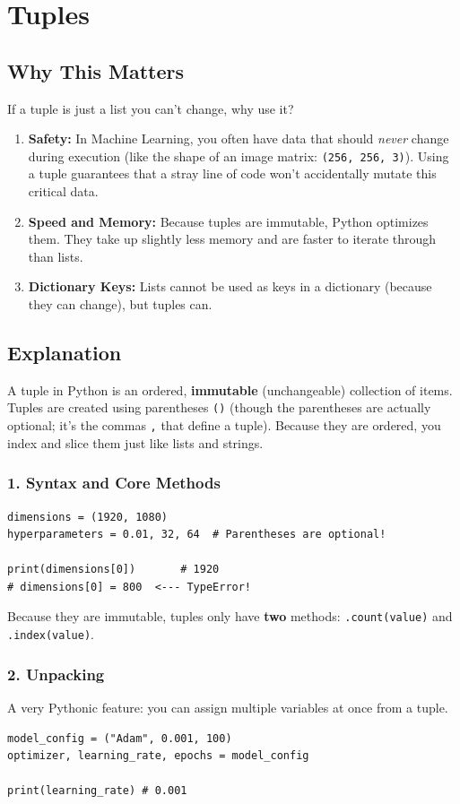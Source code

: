 \chapter{Tuples}

\section{Why This Matters}
If a tuple is just a list you can't change, why use it?
\begin{enumerate}
    \item \textbf{Safety:} In Machine Learning, you often have data that should \textit{never} change during execution (like the shape of an image matrix: \texttt{(256, 256, 3)}). Using a tuple guarantees that a stray line of code won't accidentally mutate this critical data.
    \item \textbf{Speed and Memory:} Because tuples are immutable, Python optimizes them. They take up slightly less memory and are faster to iterate through than lists.
    \item \textbf{Dictionary Keys:} Lists cannot be used as keys in a dictionary (because they can change), but tuples can.
\end{enumerate}

\section{Explanation}
A tuple in Python is an ordered, \textbf{immutable} (unchangeable) collection of items. Tuples are created using parentheses \texttt{()} (though the parentheses are actually optional; it's the commas \texttt{,} that define a tuple). Because they are ordered, you index and slice them just like lists and strings.

\subsection{1. Syntax and Core Methods}
\begin{lstlisting}
dimensions = (1920, 1080)
hyperparameters = 0.01, 32, 64  # Parentheses are optional!

print(dimensions[0])       # 1920
# dimensions[0] = 800  <--- TypeError!
\end{lstlisting}

Because they are immutable, tuples only have \textbf{two} methods: \texttt{.count(value)} and \texttt{.index(value)}.

\subsection{2. Unpacking}
A very Pythonic feature: you can assign multiple variables at once from a tuple.
\begin{lstlisting}
model_config = ("Adam", 0.001, 100)
optimizer, learning_rate, epochs = model_config

print(learning_rate) # 0.001
\end{lstlisting}

